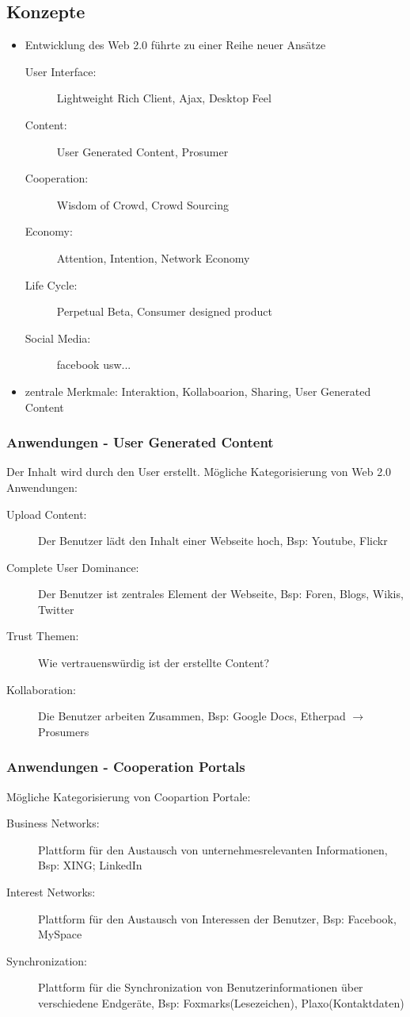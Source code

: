 \documentclass{article} %
\begin{document}
	\subsection{Konzepte}
	\begin{itemize}
		\item Entwicklung des Web 2.0 führte zu einer Reihe neuer Ansätze
		\begin{description}
			\item[User Interface:] Lightweight Rich Client, Ajax, Desktop Feel
			\item[Content:] User Generated Content, Prosumer
			\item[Cooperation:] Wisdom of Crowd, Crowd Sourcing
			\item[Economy:] Attention, Intention, Network Economy
			\item[Life Cycle:] Perpetual Beta, Consumer designed product
			\item[Social Media:] facebook usw...
		\end{description}
		\item zentrale Merkmale: Interaktion, Kollaboarion, Sharing, User Generated Content
	\end{itemize}
	\subsubsection{Anwendungen - User Generated Content}
	Der Inhalt wird durch den User erstellt. Mögliche Kategorisierung von Web 2.0 Anwendungen:
		\begin{description}
			\item [Upload Content:] Der Benutzer lädt den Inhalt einer Webseite hoch, Bsp: Youtube, Flickr
			\item [Complete User Dominance:] Der Benutzer ist zentrales Element der Webseite, Bsp: Foren, Blogs, Wikis, Twitter
			\item [Trust Themen:] Wie vertrauenswürdig ist der erstellte Content? 
			\item [Kollaboration:] Die Benutzer arbeiten Zusammen, Bsp: Google Docs, Etherpad $\rightarrow$ Prosumers
		\end{description}
	\subsubsection{Anwendungen - Cooperation Portals}
	 Mögliche Kategorisierung von Coopartion Portale:
		\begin{description}
			\item[Business Networks:] Plattform für den Austausch von unternehmesrelevanten Informationen, Bsp: XING; LinkedIn
			\item[Interest Networks:] Plattform für den Austausch von Interessen der Benutzer, Bsp: Facebook, MySpace
			\item[Synchronization:] Plattform für die Synchronization von Benutzerinformationen über verschiedene Endgeräte, Bsp: Foxmarks(Lesezeichen), Plaxo(Kontaktdaten)
		\end{description}
\end{document}
